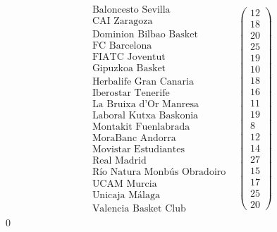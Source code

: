 	\[\begin{array}{ccc}
	\begin{array}{c}
	\text{Baloncesto Sevilla}\\
	\text{CAI Zaragoza} \\
	\text{Dominion Bilbao Basket} \\
	\text{FC Barcelona} \\
	\text{FIATC Joventut} \\
	\text{Gipuzkoa Basket} \\
	\text{Herbalife Gran Canaria} \\
	\text{Iberostar Tenerife} \\
	\text{La Bruixa d'Or Manresa} \\
	\text{Laboral Kutxa Baskonia} \\
	\text{Montakit Fuenlabrada} \\
	\text{MoraBanc Andorra} \\
	\text{Movistar Estudiantes} \\
	\text{Real Madrid} \\
	\text{Río Natura Monbús Obradoiro} \\
	\text{UCAM Murcia} \\
	\text{Unicaja Málaga} \\
	\text{Valencia Basket Club}
	\end{array} & \left(\begin{array}{c}
	12\\
	18\\
	20\\
	25\\
	19\\
	10\\
	18\\
	16\\
	11\\
	19\\
	8\\
	12\\
	14\\
	27\\
	15\\
	17\\
	25\\
	20
	\end{array} \right)
	\end{array}\]
\qed

